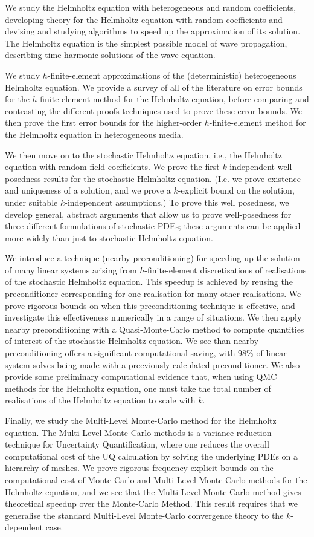 We study the Helmholtz equation with heterogeneous and random coefficients, developing theory for the Helmholtz equation with random coefficients and devising and studying algorithms to speed up the approximation of its solution. The Helmholtz equation is the simplest possible model of wave propagation, describing time-harmonic solutions of the wave equation.

We study $h$-finite-element approximations of the (deterministic) heterogeneous Helmholtz equation. We provide a survey of all of the literature on error bounds for the $h$-finite element method for the Helmholtz equation, before comparing and contrasting the different proofs techniques used to prove these error bounds. We then prove the first error bounds for the higher-order $h$-finite-element method for the Helmholtz equation in heterogeneous media.

We then move on to the stochastic Helmholtz equation, i.e., the Helmholtz equation with random field coefficients. We prove the first $k$-independent well-posedness results for the stochastic Helmholtz equation. (I.e. we prove existence and uniqueness of a solution, and we prove a $k$-explicit bound on the solution, under suitable $k$-independent assumptions.) To prove this well posedness, we develop general, abstract arguments that allow us to prove well-posedness for three different formulations of stochastic PDEs; these arguments can be applied more widely than just to stochastic Helmholtz equation.

We introduce a technique (nearby preconditioning) for speeding up the solution of many linear systems arising from $h$-finite-element discretisations of realisations of the stochastic Helmholtz equation. This speedup is achieved by reusing the preconditioner corresponding for one realisation for many other realisations. We prove rigorous bounds on when this preconditioning technique is effective, and investigate this effectiveness numerically in a range of situations. We then apply nearby preconditioning with a Quasi-Monte-Carlo method to compute quantities of interest of the stochastic Helmholtz equation. We see than nearby preconditioning offers a significant computational saving, with 98\% of linear-system solves being made with a precviously-calculated preconditioner. We also provide some preliminary computational evidence that, when using QMC methods for the Helmholtz equation, one must take the total number of realisations of the Helmholtz equation to scale with $k.$

Finally, we study the Multi-Level Monte-Carlo method for the Helmholtz equation. The Multi-Level Monte-Carlo methods is a variance reduction technique for Uncertainty Quantification, where one reduces the overall computational cost of the UQ calculation by solving the underlying PDEs on a hierarchy of meshes. We prove rigorous frequency-explicit bounds on the computational cost of Monte Carlo and Multi-Level Monte-Carlo methods for the Helmholtz equation, and we see that the Multi-Level Monte-Carlo method gives theoretical speedup over the Monte-Carlo Method. This result requires that we generalise the standard Multi-Level Monte-Carlo convergence theory to the $k$-dependent case.
